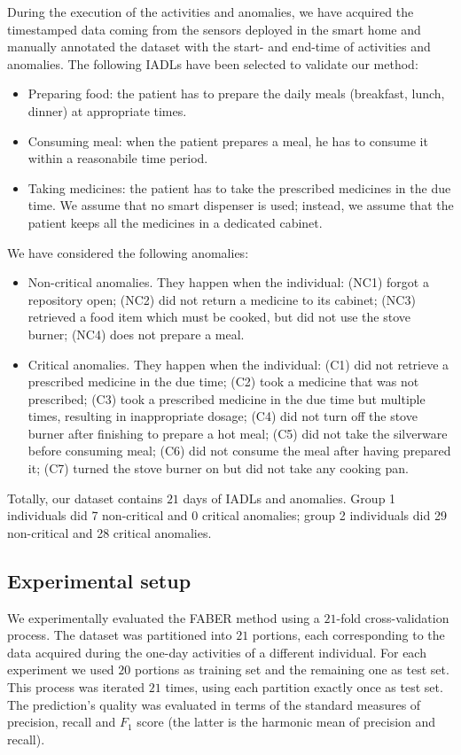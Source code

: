 \documentclass[10pt, conference, compsocconf]{IEEEtran}
\begin{document}
During the execution of the activities and anomalies, we have acquired the timestamped data coming from the sensors deployed in the smart home and manually annotated the dataset with the start- and end-time of activities and anomalies. 
The following IADLs have been selected to validate our method: 
\begin{itemize}
\item Preparing food: the patient has to prepare the daily meals (breakfast, lunch, dinner) at appropriate times.
\item Consuming meal: when the patient prepares a meal, he has to consume it within a reasonabile time period.
\item Taking medicines: the patient has to take the prescribed medicines in the due time. We assume that no smart dispenser is used; instead, we assume that the patient keeps all the medicines in a dedicated cabinet.
\end{itemize}
We have considered the following anomalies:
\begin{itemize}
\item Non-critical anomalies. They happen when the individual: (NC1) forgot a repository open; (NC2) did not return a medicine to its cabinet; (NC3) retrieved a food item which must be cooked, but did not use the stove burner; (NC4) does not prepare a meal.
\item Critical anomalies. They happen when the individual: (C1) did not retrieve a prescribed medicine in the due time; (C2) took a medicine that was not prescribed; (C3) took a prescribed medicine in the due time but multiple times, resulting in inappropriate dosage; (C4) did not turn off the stove burner after finishing to prepare a hot meal; (C5) did not take the silverware before consuming meal; (C6) did not consume the meal after having prepared it; (C7) turned the stove burner on but did not take any cooking pan.
\end{itemize}

Totally, our dataset contains $21$ days of IADLs and anomalies. Group 1 individuals did 7 non-critical and 0 critical anomalies; group 2 individuals did 29 non-critical and 28 critical anomalies.

 

\subsection{Experimental setup}
We experimentally evaluated the FABER method using
a $21$-fold cross-validation process. The dataset was partitioned into 
$21$ portions, each corresponding to the data acquired during the one-day
activities of a different individual. For each experiment we used $20$   
portions as training set and the remaining one as test set. This process was
iterated $21$ times, using each partition exactly once as test set. 
The prediction's quality was evaluated in terms of the standard measures of precision,
recall and $F_1$ score (the latter is the harmonic mean of precision and recall). 
\end{document}
